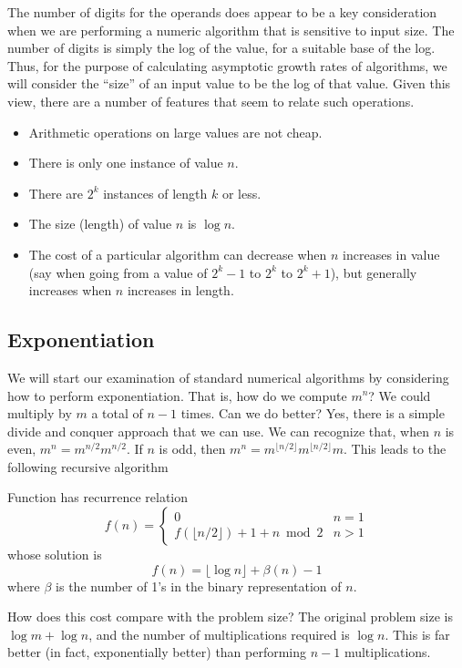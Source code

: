 The number of digits for the operands does appear to be a key
consideration when we are performing a numeric algorithm that is
sensitive to input size.
The number of digits is simply the log of the value, for a suitable
base of the log.
Thus, for the purpose of calculating asymptotic growth rates of
algorithms, we will consider the ``size'' of an input value to be the
log of that value.
Given this view, there are a number of features that seem to relate
such operations.
\begin{itemize}
\item Arithmetic operations on large values are not cheap.
\item There is only one instance of value $n$.
\item There are $2^k$ instances of length $k$ or less.
\item The size (length) of value $n$ is $\log n$.
\item The cost of a particular algorithm can decrease when $n$
increases in value (say when going from a value of $2^k-1$ to $2^k$ to
$2^k+1$),
but generally increases when $n$ increases in length.
\end{itemize}

\subsection{Exponentiation}

We will start our examination of standard numerical algorithms by
considering how to perform exponentiation.
That is, how do we compute $m^n$?
We could multiply by $m$ a total of $n-1$ times.
Can we do better?
Yes, there is a simple divide and conquer approach that we can use.
We can recognize that, when $n$ is even, $m^n = m^{n/2}m^{n/2}$.
If $n$ is odd, then
$m^n = m^{\lfloor n/2\rfloor}m^{\lfloor n/2\rfloor}m$.
This leads to the following recursive algorithm


Function  has recurrence relation
\[f(n) = \left\{
\begin{array}{ll}
0&n=1\\
f(\lfloor n/2\rfloor) + 1 + n \bmod 2&n>1
\end{array}
\right. \]
\noindent whose solution is 
\[f(n) = \lfloor \log n\rfloor + \beta(n) - 1 \]
\noindent where $\beta$ is the number of 1's in the binary
representation of $n$.

How does this cost compare with the problem size?
The original problem size is $\log m + \log n$, and the number of
multiplications required is $\log n$.
This is far better (in fact, exponentially better) than performing
$n-1$ multiplications.

